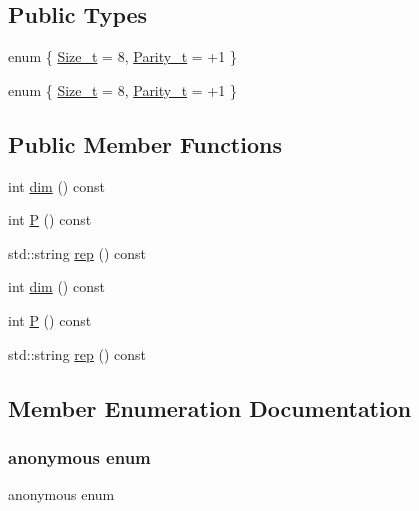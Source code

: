 \subsection*{Public Types}
\begin{DoxyCompactItemize}
\item 
enum \{ \mbox{\hyperlink{structHadron_1_1J7o2gRep_a3c93bee4eee89b25879b0a266774f679aa1b6592a332a9d2da6158813b19965b8}{Size\+\_\+t}} = 8, 
\mbox{\hyperlink{structHadron_1_1J7o2gRep_a3c93bee4eee89b25879b0a266774f679ac6e1f3a3d9fa6e3a8420d108e9586f95}{Parity\+\_\+t}} = +1
 \}
\item 
enum \{ \mbox{\hyperlink{structHadron_1_1J7o2gRep_a3c93bee4eee89b25879b0a266774f679aa1b6592a332a9d2da6158813b19965b8}{Size\+\_\+t}} = 8, 
\mbox{\hyperlink{structHadron_1_1J7o2gRep_a3c93bee4eee89b25879b0a266774f679ac6e1f3a3d9fa6e3a8420d108e9586f95}{Parity\+\_\+t}} = +1
 \}
\end{DoxyCompactItemize}
\subsection*{Public Member Functions}
\begin{DoxyCompactItemize}
\item 
int \mbox{\hyperlink{structHadron_1_1J7o2gRep_a97ec31b808524988adead87fa89810ef}{dim}} () const
\item 
int \mbox{\hyperlink{structHadron_1_1J7o2gRep_a62e4c7ff9d219d3d00fa5cd6ee9612d1}{P}} () const
\item 
std\+::string \mbox{\hyperlink{structHadron_1_1J7o2gRep_a77d8605eefc2eb9ae91df0e231d4593b}{rep}} () const
\item 
int \mbox{\hyperlink{structHadron_1_1J7o2gRep_a97ec31b808524988adead87fa89810ef}{dim}} () const
\item 
int \mbox{\hyperlink{structHadron_1_1J7o2gRep_a62e4c7ff9d219d3d00fa5cd6ee9612d1}{P}} () const
\item 
std\+::string \mbox{\hyperlink{structHadron_1_1J7o2gRep_a77d8605eefc2eb9ae91df0e231d4593b}{rep}} () const
\end{DoxyCompactItemize}


\subsection{Member Enumeration Documentation}
\mbox{\label{structHadron_1_1J7o2gRep_ae9935e9fbc11ad93c78aa1d6859e1b32}} 
\subsubsection{\texorpdfstring{anonymous enum}{anonymous enum}}
{\footnotesize\ttfamily anonymous enum}


